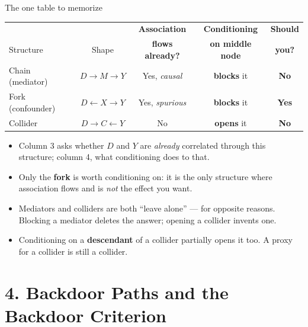 \documentclass[
  11pt,
  ignorenonframetext,
  aspectratio=169,
]{beamer}
\providecommand{\tightlist}{%
  \setlength{\itemsep}{0pt}\setlength{\parskip}{0pt}}
\begin{document}
\begin{frame}{The one table to memorize}
\protect{}\label{the-one-table-to-memorize}
\begin{center}
\small
\begin{tabular}{lcccc}
\toprule
& & \textbf{Association} & \textbf{Conditioning} & \textbf{Should} \\
Structure & Shape & \textbf{flows already?} & \textbf{on middle node} & \textbf{you?} \\
\midrule
Chain (mediator)  & $D \to M \to Y$        & Yes, \emph{causal}   & \textbf{blocks} it & \textbf{No} \\
Fork (confounder) & $D \leftarrow X \to Y$ & Yes, \emph{spurious} & \textbf{blocks} it & \textbf{Yes} \\
Collider          & $D \to C \leftarrow Y$ & No                   & \textbf{opens} it  & \textbf{No} \\
\bottomrule
\end{tabular}
\end{center}

\vspace{0.4em}

\begin{itemize}
\tightlist
\item
  Column 3 asks whether \(D\) and \(Y\) are \emph{already} correlated
  through this structure; column 4, what conditioning does to that.
\item
  Only the \textbf{fork} is worth conditioning on: it is the only
  structure where association flows and is \emph{not} the effect you
  want.
\item
  Mediators and colliders are both ``leave alone'' --- for opposite
  reasons. Blocking a mediator deletes the answer; opening a collider
  invents one.
\item
  Conditioning on a \textbf{descendant} of a collider partially opens it
  too. A proxy for a collider is still a collider.
\end{itemize}
\end{frame}

\section{4. Backdoor Paths and the Backdoor
Criterion}\label{backdoor-paths-and-the-backdoor-criterion}
\end{document}
